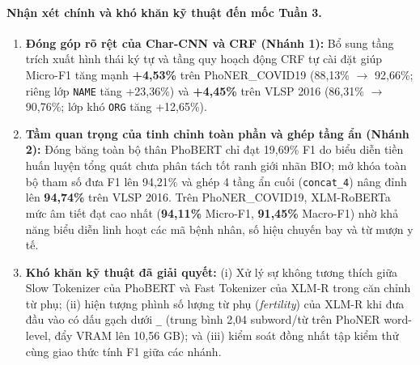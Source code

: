 \paragraph{Nhận xét chính và khó khăn kỹ thuật đến mốc Tuần 3.}
\begin{enumerate}
    \item \textbf{Đóng góp rõ rệt của Char-CNN và CRF (Nhánh 1):} Bổ sung tầng trích xuất hình thái ký tự và tầng quy hoạch động CRF tự cài đặt giúp Micro-F1 tăng mạnh \textbf{+4,53\%} trên PhoNER\_COVID19 (88,13\% $\to$ 92,66\%; riêng lớp \texttt{NAME} tăng +23,36\%) và \textbf{+4,45\%} trên VLSP 2016 (86,31\% $\to$ 90,76\%; lớp khó \texttt{ORG} tăng +12,65\%).
    \item \textbf{Tầm quan trọng của tinh chỉnh toàn phần và ghép tầng ẩn (Nhánh 2):} Đóng băng toàn bộ thân PhoBERT chỉ đạt 19,69\% F1 do biểu diễn tiền huấn luyện tổng quát chưa phân tách tốt ranh giới nhãn BIO; mở khóa toàn bộ tham số đưa F1 lên 94,21\% và ghép 4 tầng ẩn cuối (\texttt{concat\_4}) nâng đỉnh lên \textbf{94,74\%} trên VLSP 2016. Trên PhoNER\_COVID19, XLM-RoBERTa mức âm tiết đạt cao nhất (\textbf{94,11\%} Micro-F1, \textbf{91,45\%} Macro-F1) nhờ khả năng biểu diễn linh hoạt các mã bệnh nhân, số hiệu chuyến bay và từ mượn y tế.
    \item \textbf{Khó khăn kỹ thuật đã giải quyết:} (i) Xử lý sự không tương thích giữa Slow Tokenizer của PhoBERT và Fast Tokenizer của XLM-R trong căn chỉnh từ phụ; (ii) hiện tượng phình số lượng từ phụ (\textit{fertility}) của XLM-R khi đưa đầu vào có dấu gạch dưới \texttt{\_} (trung bình 2,04 subword/từ trên PhoNER word-level, đẩy VRAM lên 10,56 GB); và (iii) kiểm soát đồng nhất tập kiểm thử cùng giao thức tính F1 giữa các nhánh.
\end{enumerate}

